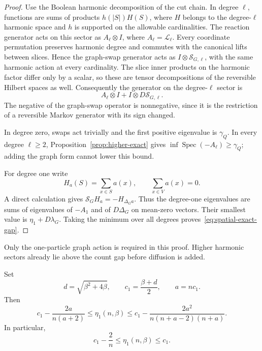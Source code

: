 \begin{proof}
Use the Boolean harmonic decomposition of the cut chain.  In degree
$\ell$, functions are sums of products $h(|S|)H(S)$, where $H$ belongs
to the degree-$\ell$ harmonic space and $h$ is supported on the
allowable cardinalities.  The reaction generator acts on this sector
as $A_\ell\otimes I$, where $A_\ell=\mathcal L_\ell$.  Every coordinate permutation preserves harmonic
degree and commutes with the canonical lifts between slices.  Hence
the graph-swap generator acts as $I\otimes\mathcal S_{G,\ell}$, with
the same harmonic action at every cardinality.  The slice inner
products on the harmonic factor differ only by a scalar, so these
are tensor decompositions of the reversible Hilbert spaces as well.
Consequently the generator on the degree-$\ell$ sector is
\begin{equation}\label{eq:spatial-tensor-sum}
 A_\ell\otimes I+I\otimes D\mathcal S_{G,\ell}.
\end{equation}
The negative of the graph-swap operator is nonnegative, since it is
the restriction of a reversible Markov generator with its sign
changed.

In degree zero, swaps act trivially and the first positive eigenvalue
is $\gamma_Q$.  In every degree $\ell\geq2$,
Proposition~\ref{prop:higher-exact} gives
$\inf\operatorname{Spec}(-A_\ell)\geq\gamma_Q$; adding the graph form
cannot lower this bound.

For degree one write
\[
 H_a(S)=\sum_{x\in S}a(x),\qquad \sum_{x\in V}a(x)=0.
\]
A direct calculation gives
$\mathcal S_G H_a=-H_{\Delta_Ga}$.  Thus the degree-one eigenvalues
are sums of eigenvalues of $-A_1$ and of $D\Delta_G$ on mean-zero
vectors.  Their smallest value is $\eta_1+D\lambda_G$.  Taking the
minimum over all degrees proves~\eqref{eq:spatial-exact-gap}.
\end{proof}

Only the one-particle graph action is required in this proof.  Higher
harmonic sectors already lie above the count gap before diffusion is
added.

\begin{proposition}
\label{prop:spatial-degree-one-sharp}
Set
\[
 d=\sqrt{\beta^2+4\beta},\qquad
 c_1=\frac{\beta+d}{2},\qquad a=nc_1.
\]
Then
\begin{equation}\label{eq:spatial-degree-one-endpoint-bracket}
 c_1-\frac{2a}{n(a+2)}
 \leq\eta_1(n,\beta)
 \leq c_1-\frac{2a^2}{n(n+a-2)(n+a)}.
\end{equation}
In particular,
\begin{equation}\label{eq:spatial-degree-one-additive-error}
 c_1-\frac2n\leq\eta_1(n,\beta)\leq c_1.
\end{equation}
\end{proposition}

